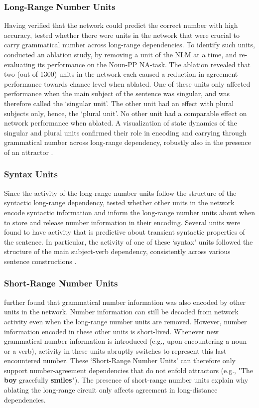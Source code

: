 \subsubsection{Long-Range Number Units}
Having verified that the network could predict the correct number with high accuracy, \citet{lakretz2019emergence} tested whether there were units in the network that were crucial to carry grammatical number across long-range dependencies.  To identify such units, \citet{lakretz2019emergence} conducted an ablation study, by removing a unit of the NLM at a time, and re-evaluating its performance on the Noun-PP NA-task. The ablation revealed that two (out of 1300) units in the network each caused a reduction in agreement performance towards chance level when ablated. One of these units only affected performance when the main subject of the sentence was singular, and was therefore called the `singular unit'. The other unit had an effect with plural subjects only, hence, the `plural unit'. 
No other unit had a comparable effect on network performance when ablated. A visualization of state dynamics of the singular and plural units confirmed their role in encoding and carrying through grammatical number across long-range dependency, robustly also in the presence of an attractor \citep[figure 1 in][]{lakretz2019emergence}.

\subsubsection{Syntax Units}
Since the activity of the long-range number units follow the structure of the syntactic long-range dependency, \citet{lakretz2019emergence} tested whether other units in the network encode syntactic information and inform the long-range number units about when to store and release number information in their encoding. Several units were found to have activity that is predictive about transient syntactic properties of the sentence. In particular, the activity of one of these `syntax' units followed the structure of the main subject-verb dependency, consistently across various sentence constructions \citep[figure 3 in][]{lakretz2019emergence}. 

\subsubsection{Short-Range Number Units}
\citet{lakretz2019emergence} further found that grammatical number information was also encoded
by other units in the network. Number information can still be
decoded from network activity even when the long-range number units
are removed. However, number information encoded in these other units is short-lived. Whenever new grammatical number information is
introduced (e.g., upon encountering a noun or a verb), activity in
these units abruptly switches to represent this last encountered
number. These `Short-Range Number Units' can therefore only support number-agreement dependencies that do not
enfold attractors (e.g., "The \textbf{boy} gracefully
\textbf{smiles}"). The presence of short-range number units explain why ablating the long-range circuit only affects agreement in long-distance dependencies.



